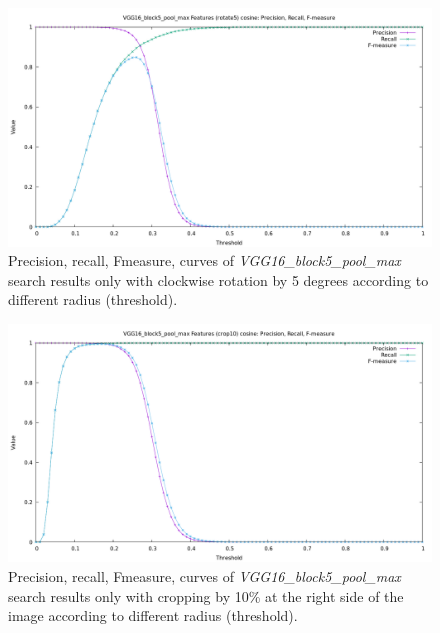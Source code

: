 \begin{figure}
	\centering
	\includegraphics[width=\textwidth]{img/benchmark_VGG16_block5_pool_max_cosine_rotate5.png}
	\caption{Precision, recall, Fmeasure, curves of \textit{VGG16\_block5\_pool\_max} search results only with clockwise rotation by 5 degrees according to different radius (threshold).}
	\label{fig:benchmark_VGG16_block5_pool_max_cosine_rotate5}
\end{figure}

\begin{figure}
	\centering
	\includegraphics[width=\textwidth]{img/benchmark_VGG16_block5_pool_max_cosine_crop10.png}
	\caption{Precision, recall, Fmeasure, curves of \textit{VGG16\_block5\_pool\_max} search results only with cropping by 10\% at the right side of the image according to different radius (threshold).}
	\label{fig:benchmark_VGG16_block5_pool_max_cosine_crop10}
\end{figure}